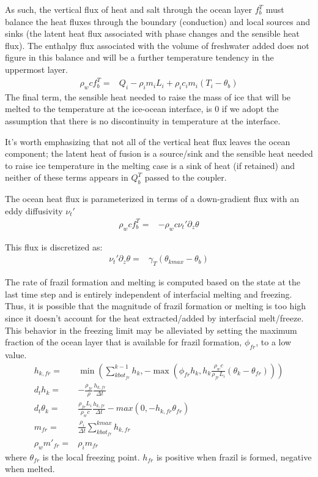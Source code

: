 \documentclass[11pt]{report}
\newcommand{\bea}{\begin{eqnarray}}
\newcommand{\eea}{\end{eqnarray}}
\begin{document}
As such, the vertical flux of heat and salt through the ocean layer $f_b^T$ must balance the heat fluxes through the boundary (conduction) and local sources and sinks (the latent heat flux associated with phase changes and the sensible heat flux). The enthalpy flux associated with the volume of freshwater added does not figure in this balance and will be a further temperature tendency in the uppermost layer.
\bea
    \rho_w c f_b^T =&Q_i -\rho_i m_i L_i + \rho_i c_i m_i (T_i - \theta_b)\label{eq:ocean_heat_flux_a}
\eea
The final term, the sensible heat needed to raise the mass of ice that will be melted to the temperature at the ice-ocean interface, is 0 if we adopt the assumption that there is no discontinuity in temperature at the interface.

It's worth emphasizing that not all of the vertical heat flux leaves the ocean component; the latent heat of fusion is a source/sink and the sensible heat needed to raise ice temperature in the melting case is a sink of heat (if retained) and neither of these terms appears in $Q_b^T$ passed to the coupler.

The ocean heat flux is parameterized in terms of a down-gradient flux with an eddy diffusivity $\nu_t'$
\bea
    \rho_w c f_b^T =& -\rho_w c \nu_t' \partial_z \theta
\eea

This flux is discretized as:
\bea
    \nu_t' \partial_z \theta =& \gamma_T(\theta_{kmax} - \theta_b)\label{eq:heat-exchange}
\eea

The rate of frazil formation and melting is computed based on the state at the last time step and is entirely independent of interfacial melting and freezing. Thus, it is possible that the magnitude of frazil formation or melting is too high since it doesn't account for the heat extracted/added by interfacial melt/freeze. This behavior in the freezing limit may be alleviated by setting the maximum fraction of the ocean layer that is available for frazil formation, $\phi_{fr}$, to a low value.
\bea
    h_{k,fr} =& \min(\sum_{kbot_{fr}}^{k-1} h_k, -\max(\phi_{fr} h_k, h_k \frac{\rho_w c}{\rho_{fr} L_i} (\theta_k - \theta_{fr})))\\
    d_t h_k =& -\frac{\rho_{fr}}{\rho} \frac{h_{k,fr}}{\Delta t}\\
    d_t \theta_k =&  \frac{\rho_{fr} L_i}{\rho_w c} \frac{h_{k,fr}}{\Delta t} - max(0, -h_{k,fr} \theta_{fr})\\
    m_{fr} =& \frac{\rho_i}{\Delta t} \sum_{kbot_{fr}}^{kmax} h_{k,fr}\\ %
    \rho_w m'_{fr} =& \rho_i m_{fr}
\eea
where $\theta_{fr}$ is the local freezing point. $h_{fr}$ is positive when frazil is formed, negative when melted.
\end{document}
